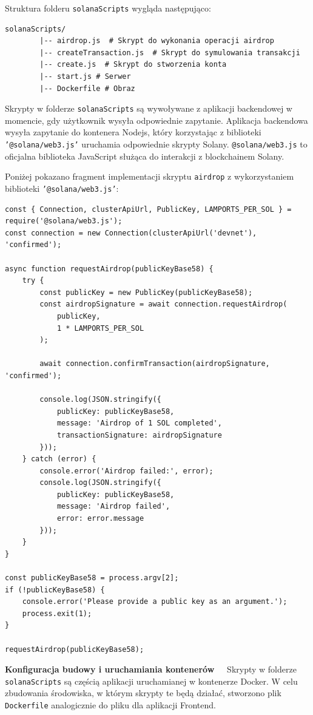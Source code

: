 Struktura folderu \texttt{solanaScripts} wygląda następująco:
\begin{lstlisting}[basicstyle=\footnotesize\ttfamily,tabsize=4]
solanaScripts/
		|-- airdrop.js  # Skrypt do wykonania operacji airdrop
		|-- createTransaction.js  # Skrypt do symulowania transakcji
		|-- create.js  # Skrypt do stworzenia konta
		|-- start.js # Serwer
		|-- Dockerfile # Obraz 
\end{lstlisting}

Skrypty w folderze \texttt{solanaScripts} są wywoływane z aplikacji backendowej w momencie, gdy użytkownik wysyła odpowiednie zapytanie. Aplikacja backendowa wysyła zapytanie do kontenera Nodejs, który korzystając z biblioteki \texttt{'@solana/web3.js'} uruchamia odpowiednie skrypty Solany. \texttt{@solana/web3.js} to oficjalna biblioteka JavaScript służąca do interakcji z blockchainem Solany.  

Poniżej pokazano fragment implementacji skryptu \texttt{airdrop} z wykorzystaniem biblioteki \texttt{'@solana/web3.js'}:
\begin{lstlisting}[style=JavaScriptStyle]
const { Connection, clusterApiUrl, PublicKey, LAMPORTS_PER_SOL } = require('@solana/web3.js');
const connection = new Connection(clusterApiUrl('devnet'), 'confirmed');

async function requestAirdrop(publicKeyBase58) {
    try {
        const publicKey = new PublicKey(publicKeyBase58);
        const airdropSignature = await connection.requestAirdrop(
            publicKey,
            1 * LAMPORTS_PER_SOL
        );

        await connection.confirmTransaction(airdropSignature, 'confirmed');

        console.log(JSON.stringify({
            publicKey: publicKeyBase58,
            message: 'Airdrop of 1 SOL completed',
            transactionSignature: airdropSignature
        }));
    } catch (error) {
        console.error('Airdrop failed:', error);
        console.log(JSON.stringify({
            publicKey: publicKeyBase58,
            message: 'Airdrop failed',
            error: error.message
        }));
    }
}

const publicKeyBase58 = process.argv[2];
if (!publicKeyBase58) {
    console.error('Please provide a public key as an argument.');
    process.exit(1);
}

requestAirdrop(publicKeyBase58);
\end{lstlisting}


\noindent \textbf{Konfiguracja budowy i uruchamiania kontenerów~~}
Skrypty w folderze \texttt{solanaScripts} są częścią aplikacji uruchamianej w kontenerze Docker. W celu zbudowania środowiska, w którym skrypty te będą działać, stworzono plik \texttt{Dockerfile} analogicznie do pliku dla aplikacji Frontend. 

